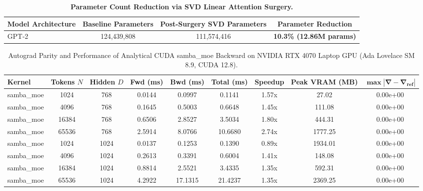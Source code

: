 \documentclass[journal]{IEEEtran}
\begin{document}
\begin{table}[h]
\centering
\small
\caption{\textbf{Parameter Count Reduction via SVD Linear Attention Surgery.}}
\label{tab:param_reduction}
\begin{tabular}{lccc}
\toprule
\textbf{Model Architecture} & \textbf{Baseline Parameters} & \textbf{Post-Surgery SVD Parameters} & \textbf{Parameter Reduction} \\
\midrule
GPT-2 & 124,439,808 & 111,574,416 & \textbf{10.3\% (12.86M params)} \\
\bottomrule
\end{tabular}
\end{table}

\begin{table}[t]
\centering
\small
\begin{tabular}{lcccccccc}
\toprule
\textbf{Kernel} & \textbf{Tokens $N$} & \textbf{Hidden $D$} & \textbf{Fwd (ms)} & \textbf{Bwd (ms)} & \textbf{Total (ms)} & \textbf{Speedup} & \textbf{Peak VRAM (MB)} & $\mathbf{\max |\nabla - \nabla_{\text{ref}}|}$ \\
\midrule
samba\_moe & 1024 & 768 & 0.0144 & 0.0997 & 0.1141 & 1.57x & 27.02 & 0.00e+00 \\
samba\_moe & 4096 & 768 & 0.1645 & 0.5003 & 0.6648 & 1.45x & 111.08 & 0.00e+00 \\
samba\_moe & 16384 & 768 & 0.6506 & 2.8527 & 3.5034 & 1.80x & 444.31 & 0.00e+00 \\
samba\_moe & 65536 & 768 & 2.5914 & 8.0766 & 10.6680 & 2.74x & 1777.25 & 0.00e+00 \\
samba\_moe & 1024 & 1024 & 0.0137 & 0.1253 & 0.1390 & 0.89x & 1934.01 & 0.00e+00 \\
samba\_moe & 4096 & 1024 & 0.2613 & 0.3391 & 0.6004 & 1.41x & 148.08 & 0.00e+00 \\
samba\_moe & 16384 & 1024 & 0.8814 & 2.5521 & 3.4335 & 1.35x & 592.31 & 0.00e+00 \\
samba\_moe & 65536 & 1024 & 4.2922 & 17.1315 & 21.4237 & 1.35x & 2369.25 & 0.00e+00 \\
\bottomrule
\end{tabular}
\caption{Autograd Parity and Performance of Analytical CUDA samba\_moe Backward on NVIDIA RTX 4070 Laptop GPU (Ada Lovelace SM 8.9, CUDA 12.8).}
\label{tab:samba_moe_benchmarks}
\end{table}

\end{document}
